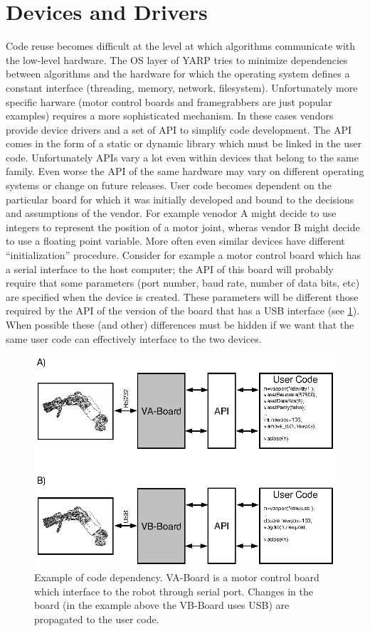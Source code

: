 \section{Devices and Drivers}

Code reuse becomes difficult at the level at which algorithms 
communicate with the low-level hardware. The OS layer of YARP tries 
to minimize dependencies between algorithms and the hardware for 
which the operating system defines a constant interface (threading, 
memory, network, filesystem). Unfortunately more specific harware 
(motor control boards and framegrabbers are just 
popular examples) requires a more sophisticated mechanism. In these 
cases vendors provide device drivers and a set of API to simplify 
code development. The API comes in the form of a static or dynamic 
library which must be linked in the user code. Unfortunately
APIs vary a lot even within devices that belong to the same family. 
Even worse the API of the same hardware may vary on different 
operating systems or change on future releases. User code becomes 
dependent on the particular board for which it was initially developed 
and bound to the decisions and assumptions of the vendor. For 
example venodor A might decide to use integers to represent the position 
of a motor joint, wheras vendor B might decide to use a floating point
variable. More often even similar devices have different ``initialization'' 
procedure. Consider for example a motor control board which has a serial
interface to the host computer; the API of this board will probably require 
that some parameters (port number, baud rate, number of data bits, etc) are 
specified when the device is created. These parameters will be different 
those required by the API of the version of the board that has a USB 
interface (see \ref{fig:devices1}). When possible these (and other) 
differences must be hidden if we want that the same user code can 
effectively interface to the two devices.

\begin{figure}[tbp]
\centerline{
\includegraphics[width=24cm]{fig-devices1.eps}
}
\caption{Example of code dependency. VA-Board is a 
motor control board which interface to the robot through serial port. 
Changes in the board (in the example above the VB-Board uses USB) are 
propagated to the user code.}\label{fig:devices1}
\end{figure}

